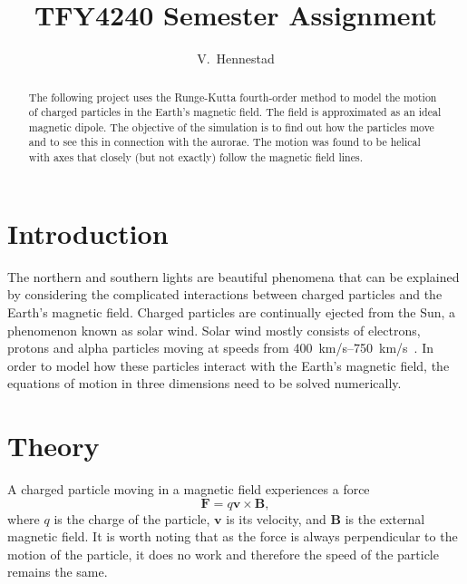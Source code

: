 \documentclass[5p,sort&compress]{elsarticle}
\begin{document}
\begin{frontmatter}

\title{TFY4240 Semester Assignment}

\author[fysikk]{V.~Hennestad}

\address[fysikk]{Department of Physics, Norwegian University of Science and Technology, 7491 Trondheimm}

\begin{abstract}
 The following project uses the Runge-Kutta fourth-order method to model the motion of charged particles in the Earth's magnetic field. The field is approximated as an ideal magnetic dipole. The objective of the simulation is to find out how the particles move and to see this in connection with the aurorae. The motion was found to be helical with axes that closely (but not exactly) follow the magnetic field lines.
\end{abstract}

\end{frontmatter}

\section{Introduction}
The northern and southern lights are beautiful phenomena that can be explained by considering the complicated interactions between charged particles and the Earth's magnetic field. Charged particles are continually ejected from the Sun, a phenomenon known as solar wind. Solar wind mostly consists of electrons, protons and alpha particles moving at speeds from \SIrange{400}{750}{\kilo \meter /\second}~\cite{Suess1999}. In order to model how these particles interact with the Earth's magnetic field, the equations of motion in three dimensions need to be solved numerically.

\section{Theory}
A charged particle moving in a magnetic field experiences a force
\begin{equation}
    \bm{F} = q \bm{v} \times \bm{B},
    \label{eq:mag_force}
\end{equation}
where $q$ is the charge of the particle, $\bm{v}$ is its velocity, and $\bm{B}$ is the external magnetic field. It is worth noting that as the force is always perpendicular to the motion of the particle, it does no work and therefore the speed of the particle remains the same.
\end{document}
